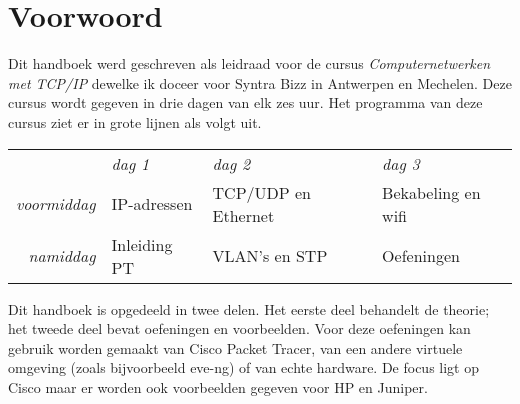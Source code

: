 \section{Voorwoord}

Dit handboek werd geschreven als leidraad voor de cursus \emph{Computernetwerken met TCP/IP} dewelke ik doceer voor Syntra Bizz in Antwerpen en Mechelen.
Deze cursus wordt gegeven in drie dagen van elk zes uur.
Het programma van deze cursus ziet er in grote lijnen als volgt uit.

\begin{center}
   \begin{tabular}{rlll}
                       & \textit{dag 1} & \textit{dag 2}      & \textit{dag 3}     \\[2ex]
   \textit{voormiddag} & IP-adressen    & TCP/UDP en Ethernet & Bekabeling en wifi \\
   \textit{namiddag}   & Inleiding PT   & VLAN's en STP       & Oefeningen         \\
   \end{tabular}
\end{center}

Dit handboek is opgedeeld in twee delen.
Het eerste deel behandelt de theorie; het tweede deel bevat oefeningen en voorbeelden.
Voor deze oefeningen kan gebruik worden gemaakt van Cisco Packet Tracer, van een andere virtuele omgeving (zoals bijvoorbeeld eve-ng) of van echte hardware.
De focus ligt op Cisco maar er worden ook voorbeelden gegeven voor HP en Juniper.